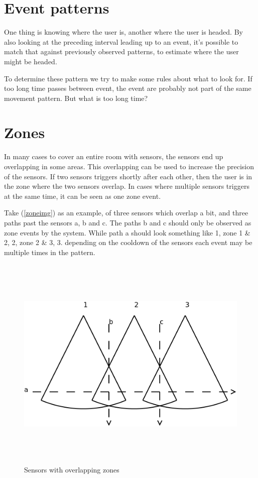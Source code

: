 \section{Event patterns}
\label{eventpatterns}

One thing is knowing where the user is, another where the user is headed. By also looking at the preceding interval leading up to an event, it's possible to match that against previously observed patterns, to estimate where the user might be headed.

To determine these pattern we try to make some rules about what to look for. If too long time passes between event, the event are probably not part of the same movement pattern. But what is too long time? 

\section{Zones}
\label{zones}

In many cases to cover an entire room with sensors, the sensors end up overlapping in some areas. This overlapping can be used to increase the precision of the sensors. If two sensors triggers shortly after each other, then the user is in the zone where the two sensors overlap. In cases where multiple sensors triggers at the same time, it can be seen as one zone event.

Take (\autoref{zoneimg}) as an example, of three sensors which overlap a bit, and three paths past the sensors a, b and c. The paths b and c should only be observed as zone events by the system. While path a should look something like 1, zone 1 \& 2, 2, zone 2 \& 3, 3. depending on the cooldown of the sensors each event may be multiple times in the pattern.

\begin{figure}[htbp]
\centering
\includegraphics[width=502pt,height=296pt]{figures/zone.png}
\caption{Sensors with overlapping zones}
\label{zoneimg}
\end{figure}




